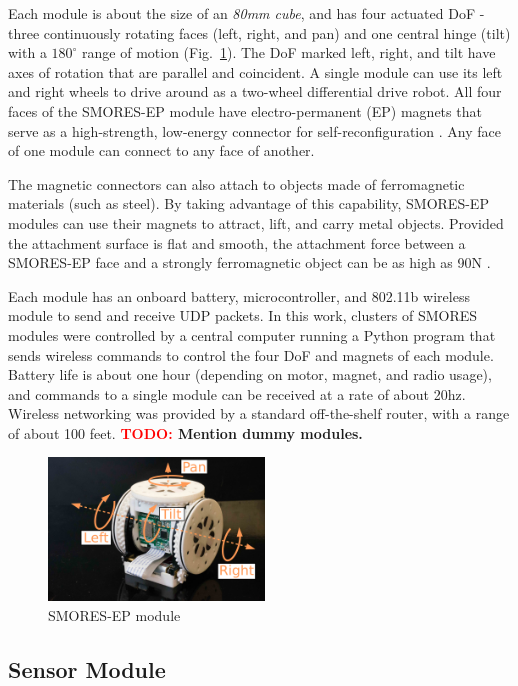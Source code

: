 \documentclass[conference]{IEEEtran}
\newcommand{\TODO}[1]{ {\bf \textcolor{red}{TODO:} #1 }}
\begin{document}
Each module is about the size of an \textit{80mm cube}, and has four actuated DoF - three continuously rotating faces (left, right, and
pan)  and one central hinge (tilt) with a \(180^\circ\) range of motion
(Fig.~\ref{fig:smores-module}). The DoF marked left, right, and tilt  have
 axes of rotation that are parallel and coincident. A single module can use its
left and right wheels to drive around as a two-wheel differential drive robot.
All four faces of the SMORES-EP module have electro-permanent (EP) magnets
that serve as a high-strength, low-energy connector for self-reconfiguration
\cite{tosun2016design}.  Any face of one module can connect to any face of
another.

The magnetic connectors can also attach to objects made of ferromagnetic
materials (such as steel).  By taking advantage of this capability, SMORES-EP
modules can use their magnets to attract, lift, and carry metal objects.
Provided the attachment surface is flat and smooth, the attachment force
between a SMORES-EP face and a strongly ferromagnetic object can be as high as
90N \cite{tosun2016design}.

Each module has an onboard battery, microcontroller, and 802.11b wireless
module to send and receive UDP packets.  In this work, clusters of SMORES
modules were controlled by a central computer running a Python program that
sends wireless commands to control the four DoF and magnets of each module.
Battery life is about one hour (depending on motor, magnet, and radio usage),
and commands to a single module can be received at a rate of about 20hz.
Wireless networking was provided by a standard off-the-shelf  router, with a
range of about 100 feet.
\TODO{Mention dummy modules.}
\begin{figure}   
\begin{center}
\includegraphics[height=1.5in]{images/smores_dof.pdf}
\end{center}
\caption{SMORES-EP module}
\label{fig:smores-module}
\end{figure}
%

\subsection{Sensor Module} %
\label{sec:sensor_module}
%
\end{document}
